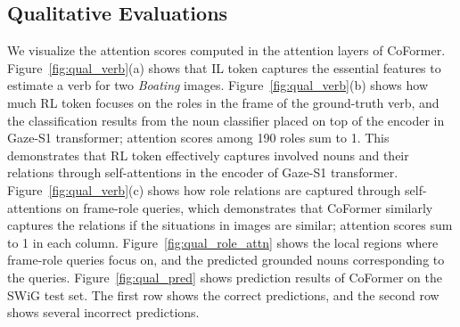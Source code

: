 \subsection{Qualitative Evaluations}
We visualize the attention scores computed in the attention layers of \mbox{CoFormer}.  
Figure~\ref{fig:qual_verb}(a) shows that IL token captures the essential features to estimate a verb for two \textit{Boating} images.
Figure~\ref{fig:qual_verb}(b) shows how much RL token focuses on the roles in the frame of the \mbox{ground-truth} verb, and the classification results from the noun classifier placed on top of the encoder in \mbox{Gaze-S1} transformer; attention scores among 190 roles sum to 1.
This demonstrates that RL token effectively
captures involved nouns and their relations through self-attentions in the encoder of \mbox{Gaze-S1} transformer. 
Figure~\ref{fig:qual_verb}(c) shows how role relations are captured through self-attentions on \mbox{frame-role} queries, which demonstrates that \mbox{CoFormer} similarly captures the relations if the situations in images are similar; attention scores sum to 1 in each column. 
Figure~\ref{fig:qual_role_attn} shows the local regions where \mbox{frame-role} queries focus on, and the predicted grounded nouns corresponding to the queries.
Figure~\ref{fig:qual_pred} shows prediction results of \mbox{CoFormer} on the SWiG test set.
The first row shows the correct predictions, and the second row shows several incorrect predictions.
